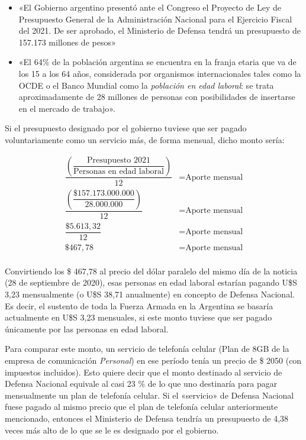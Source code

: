 \documentclass[12pt,a4paper,twoside]{book}
\begin{document}
\begin{itemize}
\item «El Gobierno argentino presentó ante el Congreso el Proyecto de Ley de Presupuesto General de la Administración Nacional para el Ejercicio Fiscal del 2021. De ser aprobado, el Ministerio de Defensa tendrá un presupuesto de 157.173 millones de pesos» \cite{defensanac:infodefensa}
\item «El 64\% de la población argentina se encuentra en la franja etaria que va de los 15 a los 64 años, considerada por organismos internacionales tales como la OCDE o el Banco Mundial como la \textit{población en edad laboral}: se trata aproximadamente de 28 millones de personas con posibilidades de insertarse en el mercado de trabajo». \cite[pág. 8]{edadlaboralarg}
\end{itemize}

Si  el presupuesto designado por el gobierno tuviese que ser pagado voluntariamente como un servicio más, de forma mensual, dicho monto sería:

\begin{align*}
\dfrac{\left( \dfrac{\text{Presupuesto 2021}}{\text{Personas en edad laboral}} \right)}{12} &= \text{Aporte mensual} \\
\dfrac{\left( \dfrac{\text{\$ } 157.173.000.000}{28.000.000} \right)}{12} &= \text{Aporte mensual} \\
\dfrac{\text{\$ } 5.613,32}{12} &= \text{Aporte mensual} \\
\text{\$ } 467,78 &= \text{Aporte mensual} \\
\end{align*}

Convirtiendo los \$ 467,78 al precio del dólar paralelo del mismo día de la noticia (28 de septiembre de 2020), esas personas en edad laboral estarían pagando U\$S 3,23 mensualmente (o U\$S 38,71 anualmente) en concepto de Defensa Nacional. Es decir, el sustento de toda la Fuerza Armada en la Argentina se basaría actualmente en U\$S 3,23 mensuales, si este monto tuviese que ser pagado únicamente por las personas en edad laboral.

Para comparar este monto, un servicio de telefonía celular (Plan de 8GB de la empresa de comunicación \textit{Personal}) en ese período tenía un precio de \$ 2050 (con impuestos incluidos). Esto quiere decir que el monto destinado al servicio de Defensa Nacional equivale al casi 23 \% de lo que uno destinaría para pagar mensualmente un plan de telefonía celular. Si el «servicio» de Defensa Nacional fuese pagado al mismo precio que el plan de telefonía celular anteriormente mencionado, entonces el Ministerio de Defensa tendría un presupuesto de 4,38 veces más alto de lo que se le es designado por el gobierno.
\end{document}
